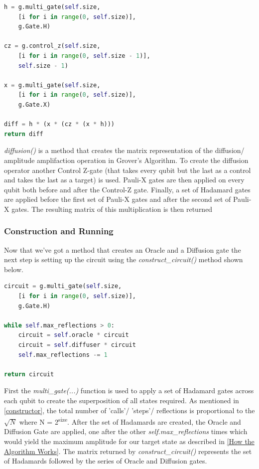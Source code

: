 \documentclass{article}
\begin{document}
\begin{file}
\begin{lstlisting}[language=Python]
h = g.multi_gate(self.size, 
	[i for i in range(0, self.size)], 
	g.Gate.H)
			
cz = g.control_z(self.size, 
	[i for i in range(0, self.size - 1)], 
	self.size - 1)
			
x = g.multi_gate(self.size, 
	[i for i in range(0, self.size)], 
	g.Gate.X)
			
diff = h * (x * (cz * (x * h)))
return diff

\end{lstlisting}
\end{file}


\textit{diffusion()} is a method that creates the matrix  representation  of the diffusion/ amplitude amplifaction operation in Grover's Algorithm. To create the diffusion operator another Control Z-gate (that takes every qubit but the last as a control and takes the last as a target) is used. Pauli-X gates are then applied on every qubit both before and after the Control-Z gate. Finally, a set of Hadamard gates are applied before the first set of Pauli-X gates and after the second set of Pauli-X gates. The resulting matrix of this multiplication is then returned
 
\subsubsection{Construction and Running}

Now that we've got a method that creates an Oracle and a Diffusion gate the next step is setting up the circuit using the \textit{construct\_circuit()} method shown below.

\begin{file}
\begin{lstlisting}[language=Python]
circuit = g.multi_gate(self.size, 
	[i for i in range(0, self.size)],
	g.Gate.H)

while self.max_reflections > 0:
	circuit = self.oracle * circuit
	circuit = self.diffuser * circuit
	self.max_reflections -= 1
	
return circuit

\end{lstlisting}
\end{file}

First the \textit{multi\_gate(...)} function is used to apply a set of Hadamard gates across each qubit to create the superposition of all states required. As mentioned in \ref{constructor}, the total number of 'calls'/ 'steps'/ reflections is proportional to the $\sqrt{N}$ where N = 2\textsuperscript{size}. After the set of Hadamards are created, the Oracle and Diffusion Gate are applied, one after the other \textit{self.max\_reflections} times which would yield the maximum amplitude for our target state as described in \ref{How the Algorithm Works}. The matrix returned by \textit{construct\_circuit()} represents the set of Hadamards followed by the series of Oracle and Diffusion gates.
\end{document}
